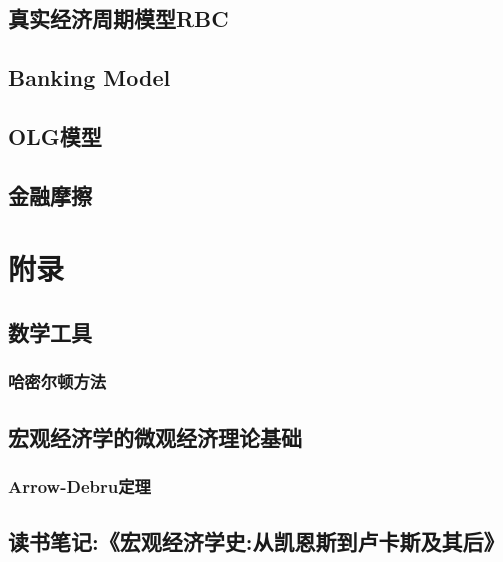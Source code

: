 \documentclass[lang=cn,10pt]{elegantbook}
\begin{document}
\chapter{真实经济周期模型RBC}

\chapter{Banking Model}

\chapter{OLG模型}

\chapter{金融摩擦}

\part{附录}
\chapter{数学工具}
\section{哈密尔顿方法}
\chapter{宏观经济学的微观经济理论基础}
\section{Arrow-Debru定理}
\chapter{读书笔记:《宏观经济学史:从凯恩斯到卢卡斯及其后》}
\end{document}
